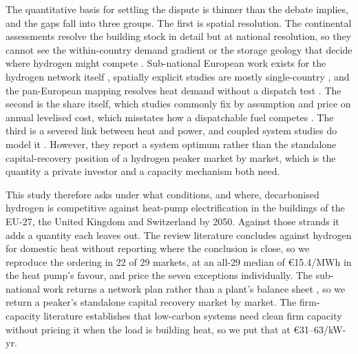 The quantitative basis for settling the dispute is thinner than the debate implies, and
the gaps fall into three groups. The first is spatial resolution. The continental
assessments resolve the building stock in detail but at national resolution, so they
cannot see the within-country demand gradient or the storage geology that decide where
hydrogen might compete \citep{Billerbeck2023Race,Brown2018Synergies}. Sub-national
European work exists for the hydrogen network itself
\citep{Neumann2023H2Network,Kountouris2024Unified}, spatially explicit studies are mostly
single-country \citep{Maestre2022,Huckebrink2022,Hoseinpoori2022}, and the pan-European
mapping resolves heat demand without a dispatch test
\citep{Mller2019Heat,Persson2019Heat}. The second is the share itself, which studies
commonly fix by assumption \citep{Weidner2023Planetary,Quarton2019Curious} and price on
annual levelised cost, which misstates how a dispatchable fuel competes
\citep{Joskow2008capacity,Quarton2019Value}. The third is a severed link between heat and
power, and coupled system studies do model it
\citep{Zeyen2021Mitigating,Mellot2024Mitigating}. However, they report a system optimum
rather than the standalone capital-recovery position of a hydrogen peaker market by
market, which is the quantity a private investor and a capacity mechanism both need.

This study therefore asks under what conditions, and where, decarbonised hydrogen is competitive against heat-pump electrification in the buildings of the EU-27, the United Kingdom and Switzerland by 2050. Against those strands it adds a quantity each leaves out. The review literature
concludes against hydrogen for domestic heat
\citep{Rosenow2022PipeDream,Rosenow2024MetaReview} without reporting where the conclusion
is close, so we reproduce the ordering in 22 of 29 markets, at an all-29 median of
\euro{}15.4/MWh in the heat pump's favour, and price the seven exceptions individually.
The sub-national work returns a network plan rather than a plant's balance sheet
\citep{Neumann2023H2Network,Kountouris2024Unified}, so we return a peaker's standalone
capital recovery market by market. The firm-capacity literature establishes that
low-carbon systems need clean firm capacity
\citep{Sepulveda2018Firm,Bistline2020ValueOfTechnology} without pricing it when the load
is building heat, so we put that at \euro{}31--63/kW-yr.

